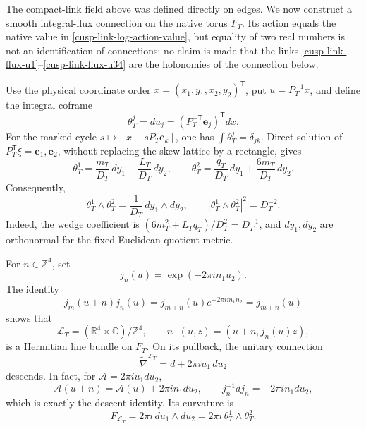 \documentclass[11pt]{article}
\theoremstyle{definition}
\numberwithin{equation}{section}
\begin{document}
The compact-link field above was defined directly on edges.  We now construct
a smooth integral-flux connection on the native torus \(F_T\).  Its action
equals the native value in \eqref{cusp-link-log-action-value}, but equality of
two real numbers is not an identification of connections: no claim is made
that the links \eqref{cusp-link-flux-u1}--\eqref{cusp-link-flux-u34} are the
holonomies of the connection below.

Use the physical coordinate order \(x=(x_1,y_1,x_2,y_2)^{\mathsf T}\), put
\(u=P_T^{-1}x\), and define the integral coframe
\begin{equation}
 \theta_T^j=du_j=(P_T^{-\mathsf T}\mathbf e_j)^{\mathsf T}dx.
 \label{cusp-link-magnetic-integral-coframe}
\end{equation}
For the marked cycle \(s\mapsto[x+sP_T\mathbf e_k]\), one has
\(\int\theta_T^j=\delta_{jk}\).  Direct solution of
\(P_T^{\mathsf T}\xi=\mathbf e_1,\mathbf e_2\), without replacing the skew
lattice by a rectangle, gives
\begin{equation}
 \theta_T^1=\frac{m_T}{D_T}\,dy_1-\frac{L_T}{D_T}\,dy_2,
 \qquad
 \theta_T^2=\frac{q_T}{D_T}\,dy_1+\frac{6m_T}{D_T}\,dy_2.
 \label{cusp-link-magnetic-first-coframe}
\end{equation}
Consequently,
\begin{equation}
 \theta_T^1\wedge\theta_T^2
 =\frac1{D_T}\,dy_1\wedge dy_2,
 \qquad
 |\theta_T^1\wedge\theta_T^2|^2=D_T^{-2}.
 \label{cusp-link-magnetic-wedge}
\end{equation}
Indeed, the wedge coefficient is
\((6m_T^2+L_Tq_T)/D_T^2=D_T^{-1}\), and \(dy_1,dy_2\)
are orthonormal for the fixed Euclidean quotient metric.

For \(n\in\mathbb Z^4\), set
\begin{equation}
 j_n(u)=\exp(-2\pi i n_1u_2).
 \label{cusp-link-magnetic-factor}
\end{equation}
The identity
\[
 j_m(u+n)j_n(u)=j_{m+n}(u)e^{-2\pi i m_1n_2}=j_{m+n}(u)
\]
shows that
\begin{equation}
 \mathscr L_T=(\mathbb R^4\times\mathbb C)/\mathbb Z^4,
 \qquad n\cdot(u,z)=(u+n,j_n(u)z),
 \label{cusp-link-magnetic-line}
\end{equation}
is a Hermitian line bundle on \(F_T\).  On its pullback, the unitary
connection
\begin{equation}
 \widetilde\nabla^{\mathscr L_T}=d+2\pi i u_1\,du_2
 \label{cusp-link-magnetic-line-connection}
\end{equation}
descends.  In fact, for \(\mathcal A=2\pi i u_1du_2\),
\[
 \mathcal A(u+n)=\mathcal A(u)+2\pi i n_1du_2,
 \qquad j_n^{-1}dj_n=-2\pi i n_1du_2,
\]
which is exactly the descent identity.  Its curvature is
\begin{equation}
 F_{\mathscr L_T}=2\pi i\,du_1\wedge du_2
 =2\pi i\,\theta_T^1\wedge\theta_T^2.
 \label{cusp-link-magnetic-line-curvature}
\end{equation}
\end{document}
